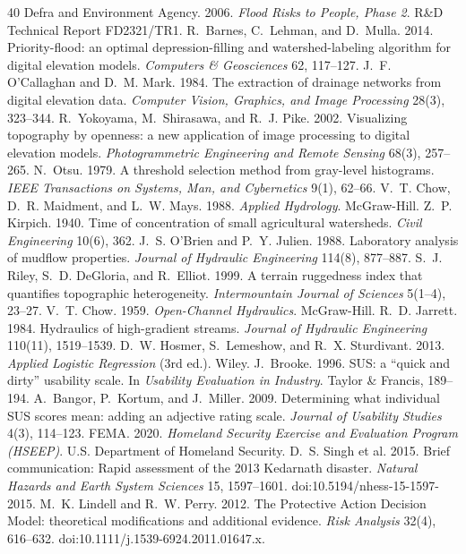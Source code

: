 \documentclass[sigconf,nonacm]{acmart}
\begin{document}
\begin{thebibliography}{40}
 Defra and Environment Agency. 2006. \emph{Flood Risks to People, Phase 2}. R\&D Technical Report FD2321/TR1.
 R.~Barnes, C.~Lehman, and D.~Mulla. 2014. Priority-flood: an optimal depression-filling and watershed-labeling algorithm for digital elevation models. \emph{Computers \& Geosciences} 62, 117--127.
 J.~F. O'Callaghan and D.~M. Mark. 1984. The extraction of drainage networks from digital elevation data. \emph{Computer Vision, Graphics, and Image Processing} 28(3), 323--344.
 R.~Yokoyama, M.~Shirasawa, and R.~J. Pike. 2002. Visualizing topography by openness: a new application of image processing to digital elevation models. \emph{Photogrammetric Engineering and Remote Sensing} 68(3), 257--265.
 N.~Otsu. 1979. A threshold selection method from gray-level histograms. \emph{IEEE Transactions on Systems, Man, and Cybernetics} 9(1), 62--66.
 V.~T. Chow, D.~R. Maidment, and L.~W. Mays. 1988. \emph{Applied Hydrology}. McGraw-Hill.
 Z.~P. Kirpich. 1940. Time of concentration of small agricultural watersheds. \emph{Civil Engineering} 10(6), 362.
 J.~S. O'Brien and P.~Y. Julien. 1988. Laboratory analysis of mudflow properties. \emph{Journal of Hydraulic Engineering} 114(8), 877--887.
 S.~J. Riley, S.~D. DeGloria, and R.~Elliot. 1999. A terrain ruggedness index that quantifies topographic heterogeneity. \emph{Intermountain Journal of Sciences} 5(1--4), 23--27.
 V.~T. Chow. 1959. \emph{Open-Channel Hydraulics}. McGraw-Hill.
 R.~D. Jarrett. 1984. Hydraulics of high-gradient streams. \emph{Journal of Hydraulic Engineering} 110(11), 1519--1539.
 D.~W. Hosmer, S.~Lemeshow, and R.~X. Sturdivant. 2013. \emph{Applied Logistic Regression} (3rd ed.). Wiley.
 J.~Brooke. 1996. SUS: a ``quick and dirty'' usability scale. In \emph{Usability Evaluation in Industry}. Taylor \& Francis, 189--194.
 A.~Bangor, P.~Kortum, and J.~Miller. 2009. Determining what individual SUS scores mean: adding an adjective rating scale. \emph{Journal of Usability Studies} 4(3), 114--123.
 FEMA. 2020. \emph{Homeland Security Exercise and Evaluation Program (HSEEP)}. U.S. Department of Homeland Security.
 D.~S. Singh et al. 2015. Brief communication: Rapid assessment of the 2013 Kedarnath disaster. \emph{Natural Hazards and Earth System Sciences} 15, 1597--1601. doi:10.5194/nhess-15-1597-2015.
 M.~K. Lindell and R.~W. Perry. 2012. The Protective Action Decision Model: theoretical modifications and additional evidence. \emph{Risk Analysis} 32(4), 616--632. doi:10.1111/j.1539-6924.2011.01647.x.
\end{thebibliography}
\end{document}
